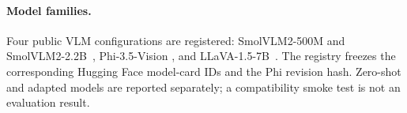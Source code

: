 \paragraph{Model families.}
Four public VLM configurations are registered: SmolVLM2-500M and
SmolVLM2-2.2B~\cite{huggingface2025smolvlm2}, Phi-3.5-Vision
\cite{microsoft2024phi35vision}, and LLaVA-1.5-7B~\cite{liu2024llava15}.
The registry freezes the corresponding Hugging Face model-card IDs and the
Phi revision hash.  Zero-shot and adapted models are reported separately; a
compatibility smoke test is not an evaluation result.
